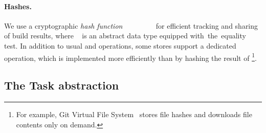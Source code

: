 \vspace{-2mm}
\paragraph{Hashes.}
We use a cryptographic \emph{hash function}
~\hs{::}~~~\hs{=>}~~\hs{->}~~
for efficient tracking and sharing of build results, where ~ is
an abstract data type equipped with~the~equality test.
In addition to usual  and  operations,
some stores support a dedicated  operation, which is implemented
more efficiently than by hashing the result of \footnote{For
example, Git Virtual File System~\cite{gvfs} stores file hashes and downloads
file contents only on demand.}.


\subsection{The Task abstraction}\label{sec-task}

